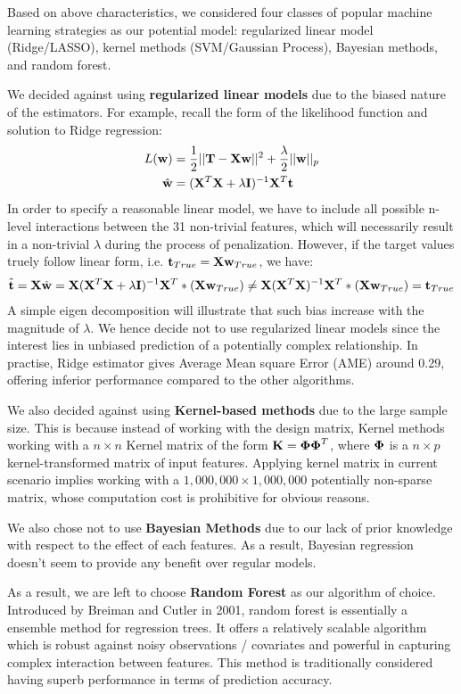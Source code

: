 \documentclass[11pt]{article}
\theoremstyle{definition}
\begin{document}
Based on above characteristics, we considered four classes of popular machine learning strategies as our potential model: regularized linear model (Ridge/LASSO), kernel methods (SVM/Gaussian Process), Bayesian methods, and random forest.

We decided against using \textbf{regularized linear models} due to the biased nature of the estimators. For example, recall the form of the likelihood function and solution to Ridge regression:
\begin{align*}
L({\bf w}) &= \frac{1}{2} || {\bf T} - {\bf X}{\bf w}||^2 + \frac{\lambda}{2}||{\bf w}||_p\\
\hat{{\bf w}} &= ({\bf X}^T{\bf X} + \lambda {\bf I})^{-1}{\bf X}^T{\bf t}
\end{align*}
In order to specify a reasonable linear model, we have to include all possible n-level interactions between the 31 non-trivial features, which will necessarily result in a non-trivial $\lambda$ during the process of penalization. However, if the target values truely follow linear form, i.e. ${\bf t}_{True} = {\bf X} {\bf w}_{True}$, we have:
\begin{align*}
\hat{{\bf t}} = {\bf X}\hat{{\bf w}} =  {\bf X}({\bf X}^T{\bf X} + \lambda {\bf I})^{-1}{\bf X}^T * ({\bf X} {\bf w}_{True}) \neq  {\bf X}({\bf X}^T{\bf X})^{-1}{\bf X}^T * ({\bf X} {\bf w}_{True}) = {\bf t}_{True} 
\end{align*}
A simple eigen decomposition will illustrate that such bias increase with the magnitude of $\lambda$. We hence decide not to use regularized linear models since the interest lies in unbiased prediction of a potentially complex relationship. In practise, Ridge estimator gives Average Mean square Error (AME) around 0.29, offering inferior performance compared to the other algorithms.

We also decided against using \textbf{Kernel-based methods} due to the large sample size. This is because instead of working with the design matrix, Kernel methods working with a $n \times n$ Kernel matrix of the form ${\bf K} = \boldsymbol{\Phi} \boldsymbol{\Phi}^T$, where $\boldsymbol{\Phi}$ is a $n \times p$ kernel-transformed matrix of input features. Applying kernel matrix in current scenario implies working with a $1,000,000 \times 1,000,000$ potentially non-sparse matrix, whose computation cost is prohibitive for obvious reasons. 

We also chose not to use \textbf{Bayesian Methods} due to our lack of prior knowledge with respect to the effect of each features. As a result, Bayesian regression doesn't seem to provide any benefit over regular models.

As a result, we are left to choose \textbf{Random Forest} as our algorithm of choice. Introduced by Breiman and Cutler in 2001, random forest is essentially a ensemble method for regression trees. It offers a relatively  scalable algorithm which is robust against noisy observations / covariates and powerful in capturing complex interaction between features. This method is traditionally considered having superb performance in terms of prediction accuracy.
\end{document}
